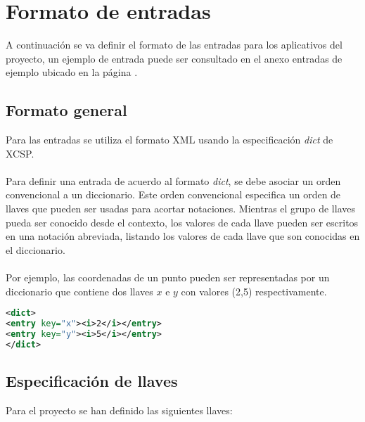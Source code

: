 \section{Formato de entradas} 

A continuación se va definir el formato de las entradas para los aplicativos del proyecto, un ejemplo de entrada puede ser consultado en el anexo entradas de ejemplo ubicado en la página \pageref{ejemploEntrada}.

\subsection{Formato general}
Para las entradas se utiliza el formato XML usando la especificación \textit{dict} de XCSP\cite{XCSP}.
\\\\
Para definir una entrada de acuerdo al formato \textit{dict}, se debe asociar un orden convencional a un diccionario. Este orden convencional especifica un orden de llaves que pueden ser usadas para acortar notaciones. Mientras el grupo de llaves pueda ser conocido desde el contexto, los valores de cada llave pueden ser escritos en una notación abreviada, listando los valores de cada llave que son conocidas en el diccionario.
\\\\
Por ejemplo, las coordenadas de un punto pueden ser representadas por un diccionario que contiene dos llaves $x$ e $y$ con valores (2,5) respectivamente.

\lstset{frameround=fttt}
\begin{lstlisting}[frame=trBL, language=XML]
<dict>
<entry key="x"><i>2</i></entry>
<entry key="y"><i>5</i></entry>
</dict>
\end{lstlisting}
\subsection{Especificación de llaves}
Para el proyecto se han definido las siguientes llaves:


